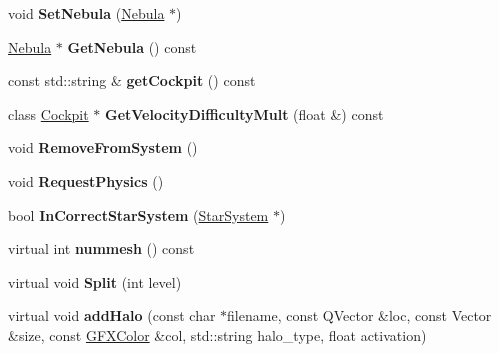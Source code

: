 \begin{DoxyCompactItemize}
\item 
void {\bfseries Set\+Nebula} (\hyperlink{classNebula}{Nebula} $\ast$)\hypertarget{classUnit_ae73867cf5625da73392341861c02847f}{}\label{classUnit_ae73867cf5625da73392341861c02847f}

\item 
\hyperlink{classNebula}{Nebula} $\ast$ {\bfseries Get\+Nebula} () const \hypertarget{classUnit_ab486c4800579d2b9f388f36cc45dafc8}{}\label{classUnit_ab486c4800579d2b9f388f36cc45dafc8}

\item 
const std\+::string \& {\bfseries get\+Cockpit} () const \hypertarget{classUnit_afbcc3439d85a00a8616fc9a994f0e430}{}\label{classUnit_afbcc3439d85a00a8616fc9a994f0e430}

\item 
class \hyperlink{classCockpit}{Cockpit} $\ast$ {\bfseries Get\+Velocity\+Difficulty\+Mult} (float \&) const \hypertarget{classUnit_a505bbd406a122a8043e54eae8ddf0ab1}{}\label{classUnit_a505bbd406a122a8043e54eae8ddf0ab1}

\item 
void {\bfseries Remove\+From\+System} ()\hypertarget{classUnit_a8f56180a59c3e720ea661c4af7d9585b}{}\label{classUnit_a8f56180a59c3e720ea661c4af7d9585b}

\item 
void {\bfseries Request\+Physics} ()\hypertarget{classUnit_a9861103139cd5f18742ceac78c7fff06}{}\label{classUnit_a9861103139cd5f18742ceac78c7fff06}

\item 
bool {\bfseries In\+Correct\+Star\+System} (\hyperlink{classStarSystem}{Star\+System} $\ast$)\hypertarget{classUnit_a088823a435a97e66c171d4c5175eae16}{}\label{classUnit_a088823a435a97e66c171d4c5175eae16}

\item 
virtual int {\bfseries nummesh} () const \hypertarget{classUnit_a7b066ce17e649780bc6804dc307f074a}{}\label{classUnit_a7b066ce17e649780bc6804dc307f074a}

\item 
virtual void {\bfseries Split} (int level)\hypertarget{classUnit_a86969393669a8ba45ae28211222bfb3b}{}\label{classUnit_a86969393669a8ba45ae28211222bfb3b}

\item 
virtual void {\bfseries add\+Halo} (const char $\ast$filename, const Q\+Vector \&loc, const Vector \&size, const \hyperlink{structGFXColor}{G\+F\+X\+Color} \&col, std\+::string halo\+\_\+type, float activation)\hypertarget{classUnit_a2db5870e581dd0f6f762c78888abfbbd}{}\label{classUnit_a2db5870e581dd0f6f762c78888abfbbd}


\end{DoxyCompactItemize}
